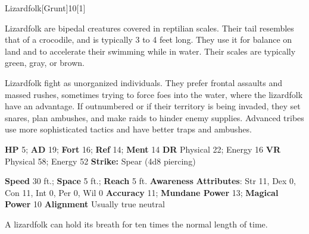   \begin{monsection}{Lizardfolk}[Grunt]{10}[1]
    \vspace{-1em}\vspace{-1em}
    \vspace{0em}

    
    Lizardfolk are bipedal creatures covered in reptilian scales.
    Their tail resembles that of a crocodile, and is typically 3 to 4 feet long.
    They use it for balance on land and to accelerate their swimming while in water.
    Their scales are typically green, gray, or brown.

    Lizardfolk fight as unorganized individuals.
    They prefer frontal assaults and massed rushes, sometimes trying to force foes into the water, where the lizardfolk have an advantage.
    If outnumbered or if their territory is being invaded, they set snares, plan ambushes, and make raids to hinder enemy supplies.
    Advanced tribes use more sophisticated tactics and have better traps and ambushes.
  
    

    \begin{spellcontent}
      \begin{spelltargetinginfo}
        \pari \textbf{HP} 5;
          \textbf{AD} 19;
          \textbf{Fort} 16;
          \textbf{Ref} 14;
          \textbf{Ment} 14
        \pari \textbf{DR} Physical 22; Energy 16
        \pari \textbf{VR} Physical 58; Energy 52
        \pari \textbf{Strike:}
            Spear  (4d8 piercing)
      \end{spelltargetinginfo}
    \end{spellcontent}
    \begin{monsterfooter}
      \pari \textbf{Speed} 30 ft.;
        \textbf{Space} 5 ft.;
        \textbf{Reach} 5 ft.
      \pari \textbf{Awareness} 
      \pari \textbf{Attributes}:
        Str 11, Dex 0,
        Con 11, Int 0,
        Per 0, Wil 0
      \pari \textbf{Accuracy} 11;
        \textbf{Mundane Power} 13;
      \textbf{Magical Power} 10
      \pari \textbf{Alignment} Usually true neutral
    \end{monsterfooter}
  \end{monsection}
   A lizardfolk can hold its breath for ten times the normal length of time.
  
